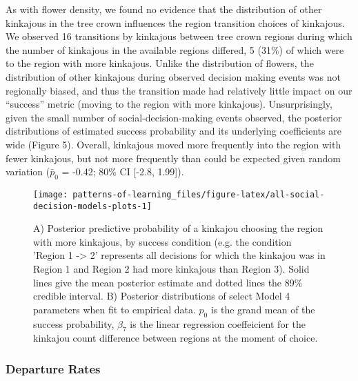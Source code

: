 \documentclass[twoside,12pt,final]{ucthesis-CA2012}
\begin{document}
\begin{ucmainmatter}
As with flower density, we found no evidence that the distribution of other kinkajous in the tree crown influences the region transition choices of kinkajous. We observed 16 transitions by kinkajous between tree crown regions during which the number of kinkajous in the available regions differed, 5 (31\%) of which were to the region with more kinkajous. Unlike the distribution of flowers, the distribution of other kinkajous during observed decision making events was not regionally biased, and thus the transition made had relatively little impact on our ``success'' metric (moving to the region with more kinkajous). Unsurprisingly, given the small number of social-decision-making events observed, the posterior distributions of estimated success probability and its underlying coefficients are wide (Figure 5). Overall, kinkajous moved more frequently into the region with fewer kinkajous, but not more frequently than could be expected given random variation (\(\bar{p}_0\) = -0.42; 80\% CI {[}-2.8, 1.99{]}).
\begin{figure}
\texttt{[image: patterns-of-learning\_files/figure-latex/all-social-decision-models-plots-1]} \caption[Posterior predictive probabilities of socially informed decisions]{A) Posterior predictive probability of a kinkajou choosing the region with more kinkajous, by success condition  (e.g. the condition 'Region 1 -> 2' represents all decisions for which the kinkajou was in Region 1 and Region 2 had more kinkajous than Region 3). Solid lines give the mean posterior estimate and dotted lines the 89\% credible interval. B) Posterior distributions of select Model 4 parameters when fit to empirical data. $p_0$ is the grand mean of the success probability, $\beta_7$ is the linear regression coeffeicient for the kinkajou count difference between regions at the moment of choice.}\label{fig:all-social-decision-models-plots}
\end{figure}
\hypertarget{departure-rates}{%
\subsubsection{Departure Rates}\label{departure-rates}}


\end{ucmainmatter}
\end{document}
